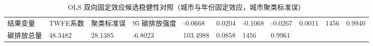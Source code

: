 \begin{table}
\caption{OLS 双向固定效应候选稳健性对照（城市与年份固定效应，城市聚类标准误）}
\label{tab:ols_twfe_candidate}
\begin{tabular}{llllllll}
\toprule
结果变量 & TWFE系数 & 聚类标准误 & 95%
\midrule
碳排放强度 & -0.0668 & 0.0204 & -0.1068 & -0.0267 & 0.0011 & 1456 & 0.9940 \\
碳排放总量 & 48.3482 & 28.1385 & -6.8023 & 103.4988 & 0.0858 & 1456 & 0.9961 \\
\bottomrule
\end{tabular}
\end{table}
